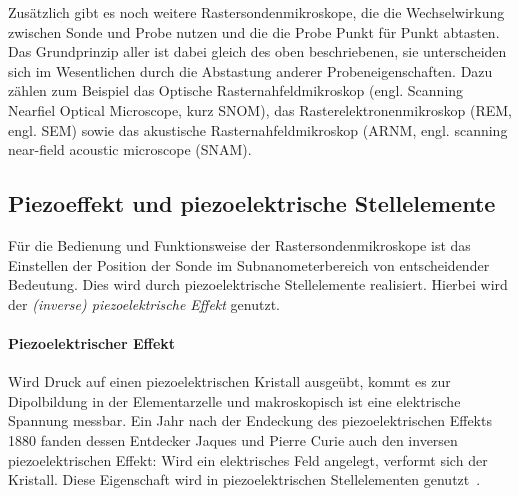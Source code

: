 \documentclass[a4paper,twoside,final]{article}
\begin{document}
Zusätzlich gibt es noch weitere Rastersondenmikroskope, die die Wechselwirkung zwischen Sonde und Probe nutzen und die die Probe Punkt für Punkt abtasten. Das Grundprinzip aller ist dabei gleich des oben beschriebenen, sie unterscheiden sich im Wesentlichen durch die Abstastung anderer Probeneigenschaften. Dazu zählen zum Beispiel das Optische Rasternahfeldmikroskop (engl. Scanning Nearfiel Optical Microscope, kurz SNOM), das Rasterelektronenmikroskop (REM, engl. SEM) sowie das akustische Rasternahfeldmikroskop (ARNM, engl. scanning near-field acoustic microscope (SNAM).

\subsection{Piezoeffekt und piezoelektrische Stellelemente}
Für die Bedienung und Funktionsweise der Rastersondenmikroskope ist das Einstellen der Position der Sonde im Subnanometerbereich von entscheidender Bedeutung. Dies wird durch piezoelektrische Stellelemente realisiert. Hierbei wird der \textit{(inverse) piezoelektrische Effekt} genutzt.
\paragraph{Piezoelektrischer Effekt} Wird Druck auf einen piezoelektrischen Kristall ausgeübt, kommt es zur Dipolbildung in der Elementarzelle und makroskopisch ist eine elektrische Spannung messbar. Ein Jahr nach der Endeckung des piezoelektrischen Effekts 1880 fanden dessen Entdecker Jaques und Pierre Curie auch den inversen piezoelektrischen Effekt: Wird ein elektrisches Feld angelegt, verformt sich der Kristall. Diese Eigenschaft wird in piezoelektrischen Stellelementen genutzt~\cite{Versuchsanleitung}.
\end{document}
